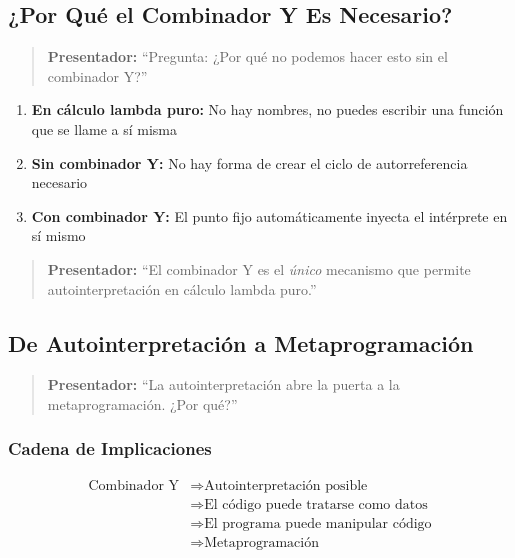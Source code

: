 \documentclass[12pt]{article}
\begin{document}
\newpage
\subsection*{¿Por Qué el Combinador Y Es Necesario?}

\begin{quote}
\textbf{Presentador:} ``Pregunta: ¿Por qué no podemos hacer esto sin el combinador Y?''
\end{quote}

\begin{enumerate}
\item \textbf{En cálculo lambda puro:} No hay nombres, no puedes escribir una función que se llame a sí misma

\item \textbf{Sin combinador Y:} No hay forma de crear el ciclo de autorreferencia necesario

\item \textbf{Con combinador Y:} El punto fijo automáticamente inyecta el intérprete en sí mismo
\end{enumerate}

\begin{quote}
\textbf{Presentador:} ``El combinador Y es el \textit{único} mecanismo que permite autointerpretación en cálculo lambda puro.''
\end{quote}

\subsection*{De Autointerpretación a Metaprogramación}

\begin{quote}
\textbf{Presentador:} ``La autointerpretación abre la puerta a la metaprogramación. ¿Por qué?''
\end{quote}

\subsubsection*{Cadena de Implicaciones}

\begin{align*}
\text{Combinador Y} &\Rightarrow \text{Autointerpretación posible} \\
&\Rightarrow \text{El código puede tratarse como datos} \\
&\Rightarrow \text{El programa puede manipular código} \\
&\Rightarrow \text{Metaprogramación}
\end{align*}
\end{document}
